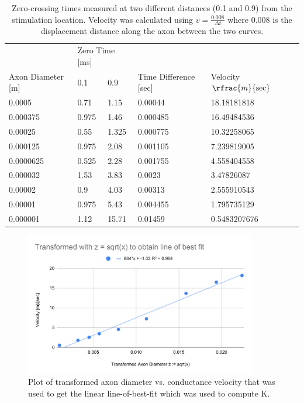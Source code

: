 \documentclass[12pt]{article}
\begin{document}
\begin{table}[h!]
\begin{tabular}{|l|l|l|l|l|}
                  & \multicolumn{2}{l}{Zero Time [ms]} &                     &                     \\
Axon Diameter [m] & 0.1              & 0.9             & Time Difference [sec] & Velocity $\rfrac{m}{\text{sec}}$ \\ \hline\hline
0.0005            & 0.71             & 1.15            & 0.00044             & 18.18181818         \\
0.000375          & 0.975            & 1.46            & 0.000485            & 16.49484536         \\
0.00025           & 0.55             & 1.325           & 0.000775            & 10.32258065         \\
0.000125          & 0.975            & 2.08            & 0.001105            & 7.239819005         \\
0.0000625         & 0.525            & 2.28            & 0.001755            & 4.558404558         \\
0.000032          & 1.53             & 3.83            & 0.0023              & 3.47826087          \\
0.00002           & 0.9              & 4.03            & 0.00313             & 2.555910543         \\
0.00001           & 0.975            & 5.43            & 0.004455            & 1.795735129         \\
0.000001          & 1.12            & 15.71               & 0.01459                   & 0.5483207676                  
\end{tabular}
\caption{Zero-crossing times measured at two different distances (0.1 and 0.9) from the stimulation location. Velocity was calculated using $v = \frac{0.008}{\Delta t}$ where 0.008 is the displacement distance along the axon between the two curves. }
\label{table:1}
\end{table}



\begin{figure}[H]
\centering
\includegraphics[width=0.9\textwidth]{Results/1a-2}
\caption{\label{fig:P1a2} Plot of transformed axon diameter vs. conductance velocity that was used to get the linear line-of-best-fit which was used to compute K.}
\end{figure}
\end{document}
